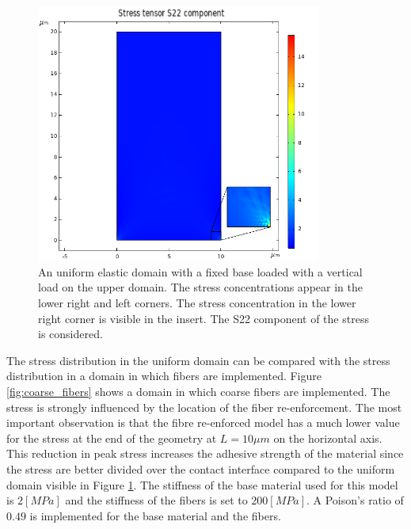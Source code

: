 \begin{figure}[h!]
    \includegraphics[width=0.7\linewidth, height=8.5cm, angle=0]{images/discrete_model_validation/blok_elastic.png}
    \caption{An uniform elastic domain with a fixed base loaded with a vertical load on the upper domain. The stress concentrations appear in the lower right and left corners. The stress concentration in the lower right corner is visible in the insert. The S22 component of the stress is considered.}
    \label{fig:uniform_elastic_stress}
\end{figure}

\qquad The stress distribution in the uniform domain can be compared with the stress distribution in a domain in which fibers are implemented. Figure \ref{fig:coarse_fibers} shows a domain in which coarse fibers are implemented. The stress is strongly influenced by the location of the fiber re-enforcement. The most important observation is that the fibre re-enforced model has a much lower value for the stress at the end of the geometry at $L = 10 \mu m$ on the horizontal axis. This reduction in peak stress increases the adhesive strength of the material since the stress are better divided over the contact interface compared to the uniform domain visible in Figure \ref{fig:uniform_elastic_stress}. The stiffness of the base material used for this model is $2 [MPa]$ and the stiffness of the fibers is set to $200 [MPa]$. A Poison's ratio of $0.49$ is implemented for the base material and the fibers.\\

